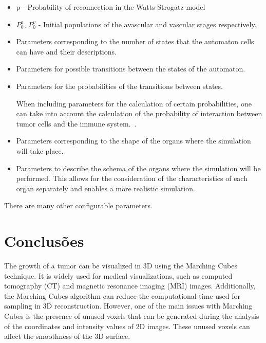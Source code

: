 \documentclass[a4paper,11pt]{article}
\begin{document}
{\begin{itemize}
    The ranges of values for the spatial components of the graph vertices are as follows: $0 \leq x \leq S_{x}$, $0 \leq y \leq S_{y}$ y $0 \leq z \leq S_{z}$.

    \item p - Probability of reconnection in the Watts-Strogatz model
    \item $P_0^a$, $P_0^v$ - Initial populations of the avascular and vascular stages respectively.
    ~\cite{Tesis de Darien}
    \item Parameters corresponding to the number of states that the automaton cells can have and their descriptions.
    \item Parameters for possible transitions between the states of the automaton.
    \item Parameters for the probabilities of the transitions between states.
    
    When including parameters for the calculation of certain probabilities, one can take into account the calculation of the probability of interaction between tumor cells and the immune system.~\cite{6}.
    \item Parameters corresponding to the shape of the organs where the simulation will take place.
    \item Parameters to describe the schema of the organs where the simulation will be performed. This allows for the consideration of the characteristics of each organ separately and enables a more realistic simulation.
\end{itemize}

There are many other configurable parameters.\\


\section*{Conclusões}

The growth of a tumor can be visualized in 3D using the Marching Cubes technique. It is widely used for medical visualizations, such as computed tomography (CT) and magnetic resonance imaging (MRI) images. Additionally, the Marching Cubes algorithm can reduce the computational time used for sampling in 3D reconstruction. However, one of the main issues with Marching Cubes is the presence of unused voxels that can be generated during the analysis of the coordinates and intensity values of 2D images. These unused voxels can affect the smoothness of the 3D surface.~\cite{8}

}
\end{document}
